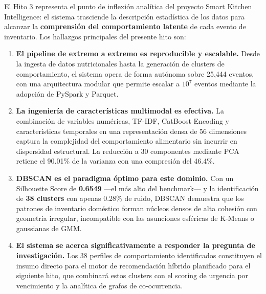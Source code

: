 \documentclass[12pt,a4paper]{article}
\newcommand{\winner}[1]{\textcolor{successgreen}{\textbf{#1}}}
\begin{document}
El Hito 3 representa el punto de inflexión analítica del proyecto Smart Kitchen Intelligence: el sistema trasciende la descripción estadística de los datos para alcanzar la \textbf{comprensión del comportamiento latente} de cada evento de inventario. Los hallazgos principales del presente hito son:

\begin{enumerate}
    \item \textbf{El pipeline de extremo a extremo es reproducible y escalable.} Desde la ingesta de datos nutricionales hasta la generación de clusters de comportamiento, el sistema opera de forma autónoma sobre 25{,}444 eventos, con una arquitectura modular que permite escalar a $10^7$ eventos mediante la adopción de PySpark y Parquet.

    \item \textbf{La ingeniería de características multimodal es efectiva.} La combinación de variables numéricas, TF-IDF, CatBoost Encoding y características temporales en una representación densa de 56 dimensiones captura la complejidad del comportamiento alimentario sin incurrir en dispersidad estructural. La reducción a 30 componentes mediante PCA retiene el 90.01\% de la varianza con una compresión del 46.4\%.

    \item \textbf{DBSCAN es el paradigma óptimo para este dominio.} Con un Silhouette Score de \winner{0.6549} —el más alto del benchmark— y la identificación de \winner{38 clusters} con apenas 0.28\% de ruido, DBSCAN demuestra que los patrones de inventario doméstico forman núcleos densos de alta cohesión con geometría irregular, incompatible con las asunciones esféricas de K-Means o gaussianas de GMM.

    \item \textbf{El sistema se acerca significativamente a responder la pregunta de investigación.} Los 38 perfiles de comportamiento identificados constituyen el insumo directo para el motor de recomendación híbrido planificado para el siguiente hito, que combinará estos clusters con el scoring de urgencia por vencimiento y la analítica de grafos de co-ocurrencia.
\end{enumerate}
\end{document}
